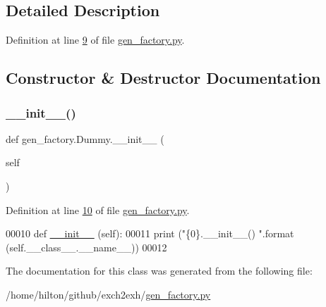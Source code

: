 \subsection{Detailed Description}


Definition at line \hyperlink{gen__factory_8py_source_l00009}{9} of file \hyperlink{gen__factory_8py_source}{gen\+\_\+factory.\+py}.



\subsection{Constructor \& Destructor Documentation}
\mbox{\label{classgen__factory_1_1_dummy_aed8c66d829aedd98a5b1bed80725ffab}} 
\subsubsection{\texorpdfstring{\+\_\+\+\_\+init\+\_\+\+\_\+()}{\_\_init\_\_()}}
{\footnotesize\ttfamily def gen\+\_\+factory.\+Dummy.\+\_\+\+\_\+init\+\_\+\+\_\+ (\begin{DoxyParamCaption}\item[{}]{self }\end{DoxyParamCaption})}



Definition at line \hyperlink{gen__factory_8py_source_l00010}{10} of file \hyperlink{gen__factory_8py_source}{gen\+\_\+factory.\+py}.


\begin{DoxyCode}
00010     \textcolor{keyword}{def }\hyperlink{namespacestart__time_a9c9bd378729a13c96a22c8b079ea172c}{\_\_init\_\_} (self):
00011         \textcolor{keywordflow}{print} (\textcolor{stringliteral}{"\{0\}.\_\_init\_\_() "}.format (self.\_\_class\_\_.\_\_name\_\_))
00012 
\end{DoxyCode}


The documentation for this class was generated from the following file\+:\begin{DoxyCompactItemize}
\item 
/home/hilton/github/exch2exh/\hyperlink{gen__factory_8py}{gen\+\_\+factory.\+py}\end{DoxyCompactItemize}
